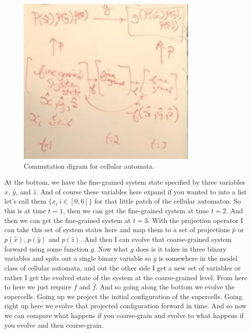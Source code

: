 \documentclass[]{article}
\begin{document}
\begin{figure}[H]
	\begin{center}
		\caption{Commutation digram for cellular automata.}
		\includegraphics[width=0.8\textwidth]{commutation-2}
	\end{center}
\end{figure}
At the bottom, we have the fine-grained system state specified by three variables $\hat{x}$, $\hat{y}$, and $\hat{z}$.
And of course these variables here expand
if you wanted to into a list let's call them $\{x_i\: i \in [0,6]\}$ for that little patch of the cellular automaton.
So this is at time $t=1$, then we can get the fine-grained system at time $t=2$.
And then we can get the fine-grained system at $t=3$.
With the projection operator I can take this set of system states here
and map them to a set of projections $\hat{p}$ or $p(\hat{x})$,  $p(\hat{y})$ and  $p(\hat{z})$.
And then I can evolve that coarse-grained system forward using some function $g$.
Now what $g$ does is it takes in three binary variables and spits out a single binary variable so $g$ is somewhere in the model class of cellular automata, and out the other side I get a new set of variables or rather I get the evolved state of the system at the coarse-grained level.
From here to here we just require $f$ and $\hat{f}$.
And so going along the bottom we evolve the supercells.
Going up we project the initial configuration of the supercells.
Going right up here we evolve that projected configuration forward in time.
And so now we can compare what happens if you coarse-grain and evolve to what happens if you evolve and then coarse-grain.
\end{document}
